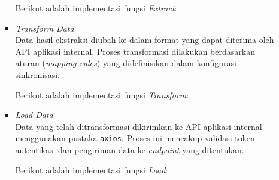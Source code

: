 \begin{enumerate}[label*=\arabic*.,ref=\arabic*]
\begin{enumerate}[label=\alph*.]
\begin{itemize}
                    Berikut adalah implementasi fungsi \textit{Extract}:
                    

                    \item \textit{Transform Data}\\
                    Data hasil ekstraksi diubah ke dalam format yang dapat diterima oleh API aplikasi internal. Proses transformasi dilakukan berdasarkan aturan (\textit{mapping rules}) yang didefinisikan dalam konfigurasi sinkronisasi.

                    Berikut adalah implementasi fungsi \textit{Transform}:
                    

                    \item \textit{Load Data}\\
                    Data yang telah ditransformasi dikirimkan ke API aplikasi internal menggunakan pustaka \texttt{axios}. Proses ini mencakup validasi token autentikasi dan pengiriman data ke \textit{endpoint} yang ditentukan.

                    Berikut adalah implementasi fungsi \textit{Load}:
                    
                \end{itemize}
        \end{enumerate}
\end{enumerate}
